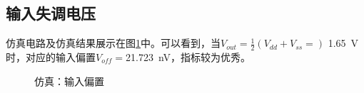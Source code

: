 \documentclass[UTF8]{ctexart}
\numberwithin{figure}{subsection}
\numberwithin{table}{subsection}
\numberwithin{equation}{subsection}
\begin{document}
\subsection{输入失调电压}
仿真电路及仿真结果展示在图\ref{Voff simulation}中。可以看到，当\(V_{out} = \frac{1}{2}\left(V_{dd} + V_{ss} = \right)\) \SI[]{1.65}{\volt}时，对应的输入偏置\(V_{off} = \)\SI[]{21.723}{\nano\volt}，指标较为优秀。

\begin{figure}[H]
    \centering
    \caption{仿真：输入偏置}
    \label{Voff simulation}
\end{figure}
\end{document}

